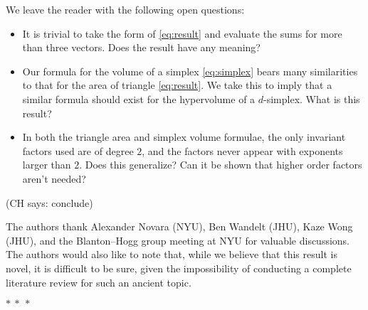 \documentclass[12pt]{article}
\newcommand{\CH}[1]{{\color{blue} (CH says: #1)}}
\begin{document}
We leave the reader with the following open questions:
\begin{itemize}
    \item It is trivial to take the form of \eqref{eq:result} and evaluate the sums for more than three vectors. Does the result have any meaning?

    \item Our formula for the volume of a simplex \eqref{eq:simplex} bears many similarities to that for the area of triangle \eqref{eq:result}. We take this to imply that a similar formula should exist for the hypervolume of a $d$-simplex. What is this result?

    \item In both the triangle area and simplex volume formulae, the only invariant factors used are of degree $2$, and the factors never appear with exponents larger than $2$. Does this generalize? Can it be shown that higher order factors aren't needed?
\end{itemize}

\CH{conclude}

The authors thank Alexander Novara (NYU), Ben Wandelt (JHU), Kaze Wong (JHU), and the Blanton--Hogg group meeting at NYU for valuable discussions. The authors would also like to note that, while we believe that this result is novel, it is difficult to be sure, given the impossibility of conducting a complete literature review for such an ancient topic.

\bigskip
{\centering $\ast~\ast~\ast$ \par}

\renewcommand{\section}[2]{}%
{\small\singlespacing}
\end{document}
